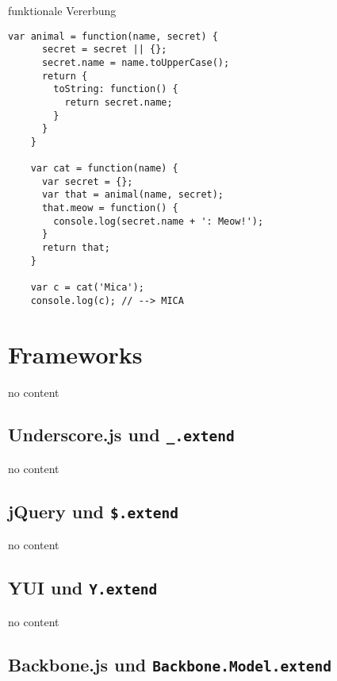\begin{frame}[fragile]{funktionale Vererbung}
  \begin{lstlisting}[gobble=4]
    var animal = function(name, secret) {
      secret = secret || {};
      secret.name = name.toUpperCase();
      return {
        toString: function() {
          return secret.name;
        }
      }
    }
    
    var cat = function(name) {
      var secret = {};
      var that = animal(name, secret);
      that.meow = function() {
        console.log(secret.name + ': Meow!');
      }
      return that;
    }
    
    var c = cat('Mica');
    console.log(c); // --> MICA
  \end{lstlisting}
\end{frame}

\section{Frameworks}

\begin{frame}
  no content
\end{frame}

\subsection{Underscore.js und \texttt{\_.extend}}

\begin{frame}
  no content
\end{frame}

\subsection{jQuery und \texttt{\$.extend}}

\begin{frame}
  no content
\end{frame}

\subsection{YUI und \texttt{Y.extend}}

\begin{frame}
  no content
\end{frame}

\subsection{Backbone.js und \texttt{Backbone.Model.extend}}

